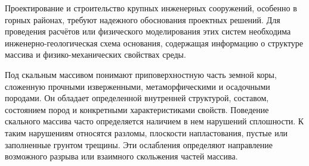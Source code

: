 
\date{20/XI/2010} %



\maketitle


Проектирование и строительство крупных инженерных сооружений, особенно в горных районах, требуют надежного обоснования проектных решений. Для проведения расчётов или физического моделирования этих систем необходима инженерно-геологическая схема основания, содержащая информацию о структуре массива и физико-механических свойствах среды.

Под скальным массивом понимают приповерхностную часть земной коры, сложенную прочными изверженными, метаморфическими и осадочными породами. Он обладает определенной внутренней структурой, составом, состоянием пород и конкретными характеристиками свойств. Поведение скального массива часто определяется наличием в нем нарушений сплошности. К таким нарушениям относятся разломы, плоскости напластования, пустые или заполненные грунтом трещины. Эти ослабления определяют направление возможного разрыва или взаимного скольжения частей массива.

